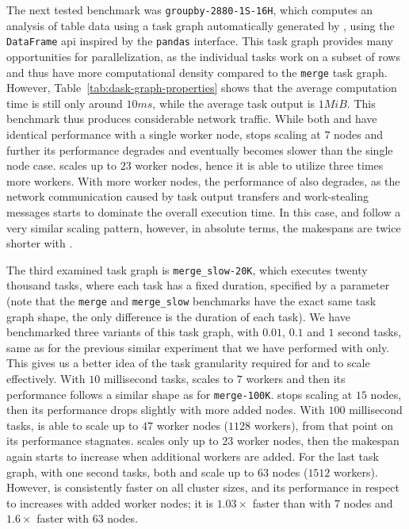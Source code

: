The next tested benchmark was \texttt{groupby-2880-1S-16H}, which computes an analysis of table data
using a task graph automatically generated by \dask{}, using the
\texttt{DataFrame} \gls{api} inspired by the \texttt{pandas}
interface. This task graph provides many opportunities for parallelization, as the individual tasks
work on a subset of rows and thus have more computational density compared to the
\texttt{merge} task graph. However, Table~\ref{tab:dask-graph-properties} shows that the
average computation time is still only around $10ms$, while the average task
output is $1 MiB$. This benchmark thus produces considerable network traffic.
While both \dask{} and \rsds{} have identical performance
with a single worker node, \dask{} stops scaling at $7$
nodes and further its performance degrades and eventually becomes slower than the single node case.
\rsds{} scales up to $23$ worker nodes, hence it is able
to utilize three times more workers. With more worker nodes, the performance of
\rsds{} also degrades, as the network communication caused by task output
transfers and work-stealing messages starts to dominate the overall execution time. In this case,
\dask{} and \rsds{} follow a very similar scaling pattern,
however, in absolute terms, the makespans are twice shorter with \rsds{}.

The third examined task graph is \texttt{merge\_slow-20K}, which executes twenty thousand tasks,
where each task has a fixed duration, specified by a parameter (note that the
\texttt{merge} and \texttt{merge\_slow} benchmarks have the exact same task
graph shape, the only difference is the duration of each task). We have benchmarked three variants
of this task graph, with $0.01$, $0.1$ and
$1$ second tasks, same as for the previous similar experiment that we have
performed with \dask{} only. This gives us a better idea of the task
granularity required for \dask{} and \rsds{} to scale
effectively. With $10$ millisecond tasks, \dask{} scales
to $7$ workers and then its performance follows a similar shape as for
\texttt{merge-100K}. \rsds{} stops scaling at
$15$ nodes, then its performance drops slightly with more added nodes. With
$100$ millisecond tasks, \rsds{} is able to scale up to
$47$ worker nodes ($1128$ workers), from that point on
its performance stagnates. \dask{} scales only up to $23$
worker nodes, then the makespan again starts to increase when additional workers are added. For the
last task graph, with one second tasks, both \rsds{} and
\dask{} scale up to $63$ nodes
($1512$ workers). However, \rsds{} is consistently faster
on all cluster sizes, and its performance in respect to \dask{} increases with
added worker nodes; it is $1.03\times$ faster than \dask{} with
$7$ nodes and $1.6\times$ faster with
$63$ nodes.

